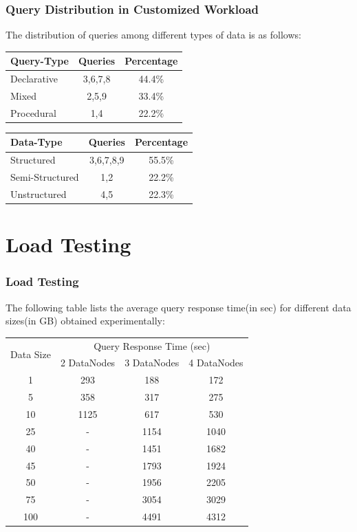 \documentclass[12pt,xcolor=dvipsnames]{beamer}
\begin{document}
\begin{frame}[t]
\frametitle{Query Distribution in Customized Workload}
The distribution of queries among different types of data is as follows:
\begin{center}
\begin{tabular}{|l|c|c|}\hline
Query-Type & Queries & Percentage\\\hline
Declarative & 3,6,7,8 & 44.4\% \\
Mixed & 2,5,9 & 33.4\% \\
Procedural & 1,4 & 22.2\%\\\hline
\end{tabular}
\end{center}

\begin{center}
\begin{tabular}{|l|c|c|}\hline
 Data-Type & Queries & Percentage\\\hline
 Structured & 3,6,7,8,9 & 55.5\%\\
 Semi-Structured & 1,2 & 22.2\%\\
 Unstructured & 4,5 & 22.3\%\\\hline
\end{tabular}

\end{center}

\end{frame}

\section{Load Testing}
\begin{frame}[t]
\frametitle{Load Testing}
The following table lists the average query response time(in sec) for different data sizes(in GB) obtained experimentally:
\begin{center}
\begin{tabular}{|c|c|c|c|}\hline
\multirow{2}{*}{Data Size} & \multicolumn{3}{c|}{Query Response Time (sec)}\\
\cline{2-4}
& 2 DataNodes & 3 DataNodes & 4 DataNodes\\\hline
1 & 293 & 188 & 172\\
5 & 358 & 317 & 275\\
10 & 1125 & 617 & 530\\
25 & - & 1154 & 1040\\
40 & - & 1451 & 1682\\
45 & - & 1793 & 1924\\
50 & - & 1956 & 2205\\
75 & - & 3054 & 3029\\
100 & - & 4491 & 4312\\\hline
\end{tabular}
\end{center}
\end{frame}
\end{document}
